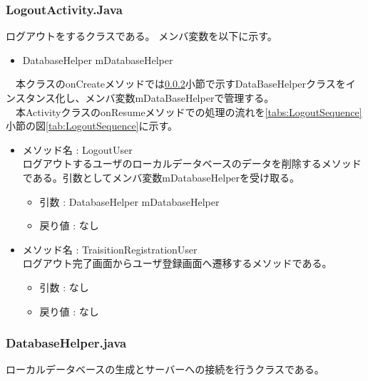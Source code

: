 \documentclass[a4j]{jarticle}
\begin{document}
\subsubsection{LogoutActivity.Java}
\label{tab:Logout}
ログアウトをするクラスである。
メンバ変数を以下に示す。
\begin{itemize}
\item DatabaseHelper mDatabaseHelper
\end{itemize}
　本クラスのonCreateメソッドでは\ref{tab:DatabaseHelper}小節で示すDataBaseHelperクラスをインスタンス化し、メンバ変数mDataBaseHelperで管理する。\\
　本ActivityクラスのonResumeメソッドでの処理の流れを\ref{tabs:LogoutSequence}小節の図\ref{tab:LogoutSequence}に示す。
\begin{itemize}
\item メソッド名 : LogoutUser\\
  ログアウトするユーザのローカルデータベースのデータを削除するメソッドである。引数としてメンバ変数mDatabaseHelperを受け取る。
  \begin{itemize}
  \item 引数 : DatabaseHelper mDatabaseHelper
  \item 戻り値 : なし
  \end{itemize}

\item メソッド名 : TraisitionRegistrationUser\\
  ログアウト完了画面からユーザ登録画面へ遷移するメソッドである。
  \begin{itemize}
  \item 引数 : なし
  \item 戻り値 : なし
  \end{itemize}
\end{itemize}


\subsubsection{DatabaseHelper.java}
\label{tab:DatabaseHelper}

ローカルデータベースの生成とサーバーへの接続を行うクラスである。
\end{document}
